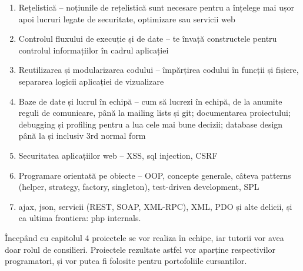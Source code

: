 \begin{enumerate}
\item Rețelistică -- noțiunile de rețelistică sunt necesare pentru a înțelege mai
ușor apoi lucruri legate de securitate, optimizare sau servicii web
\item Controlul fluxului de execuție și de date -- te învață constructele pentru
controlul informațiilor în cadrul aplicației
\item Reutilizarea și modularizarea codului -- împărțirea codului în funcții și
fișiere, separarea logicii aplicației de vizualizare
\item Baze de date și lucrul în echipă -- cum să lucrezi în echipă, de la anumite
reguli de comunicare, până la mailing lists și git; documentarea proiectului;
debugging și profiling pentru a lua cele mai bune decizii; database design până
la și inclusiv 3rd normal form
\item Securitatea aplicațiilor web -- XSS, sql injection, CSRF
\item Programare orientată pe obiecte -- OOP, concepte generale, câteva patterns
(helper, strategy, factory, singleton), test-driven development, SPL
\item ajax, json, servicii (REST, SOAP, XML-RPC), XML, PDO și alte delicii, și ca
{\glqq}ultima frontiera{\grqq}: php internals.
\end{enumerate}

Începând cu capitolul 4 proiectele se vor realiza în echipe, iar tutorii vor avea
doar rolul de consilieri. Proiectele rezultate astfel vor aparține respectivilor
programatori, și vor putea fi folosite pentru portofoliile cursanților.
